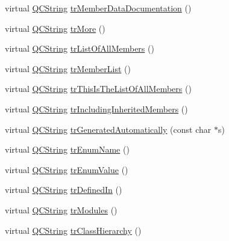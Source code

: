 \begin{DoxyCompactItemize}
\item 
virtual \mbox{\hyperlink{class_q_c_string}{Q\+C\+String}} \mbox{\hyperlink{class_translator_chinesetraditional_a61381745fb939687e8a569ec137cc60c}{tr\+Member\+Data\+Documentation}} ()
\item 
virtual \mbox{\hyperlink{class_q_c_string}{Q\+C\+String}} \mbox{\hyperlink{class_translator_chinesetraditional_ad91d5ea9f31d47efac43960215ce6179}{tr\+More}} ()
\item 
virtual \mbox{\hyperlink{class_q_c_string}{Q\+C\+String}} \mbox{\hyperlink{class_translator_chinesetraditional_a2cf1edd61c495a0858c2a40a97a8212a}{tr\+List\+Of\+All\+Members}} ()
\item 
virtual \mbox{\hyperlink{class_q_c_string}{Q\+C\+String}} \mbox{\hyperlink{class_translator_chinesetraditional_a4d1801a929911c35cf61bd97b7fdcbbc}{tr\+Member\+List}} ()
\item 
virtual \mbox{\hyperlink{class_q_c_string}{Q\+C\+String}} \mbox{\hyperlink{class_translator_chinesetraditional_a2c635ff592e3ca67083d33a8aae4d6be}{tr\+This\+Is\+The\+List\+Of\+All\+Members}} ()
\item 
virtual \mbox{\hyperlink{class_q_c_string}{Q\+C\+String}} \mbox{\hyperlink{class_translator_chinesetraditional_a790281b961ba62ba8135fc4bb483e8f3}{tr\+Including\+Inherited\+Members}} ()
\item 
virtual \mbox{\hyperlink{class_q_c_string}{Q\+C\+String}} \mbox{\hyperlink{class_translator_chinesetraditional_a55b530fe9a9148594cf5899e871d6972}{tr\+Generated\+Automatically}} (const char $\ast$s)
\item 
virtual \mbox{\hyperlink{class_q_c_string}{Q\+C\+String}} \mbox{\hyperlink{class_translator_chinesetraditional_a8709752d130f7edea050ea7daccf2cf1}{tr\+Enum\+Name}} ()
\item 
virtual \mbox{\hyperlink{class_q_c_string}{Q\+C\+String}} \mbox{\hyperlink{class_translator_chinesetraditional_a91000e25a060911c81b829f8fb34c3fb}{tr\+Enum\+Value}} ()
\item 
virtual \mbox{\hyperlink{class_q_c_string}{Q\+C\+String}} \mbox{\hyperlink{class_translator_chinesetraditional_af8a311b8bf69fb4f6985a3e542796337}{tr\+Defined\+In}} ()
\item 
virtual \mbox{\hyperlink{class_q_c_string}{Q\+C\+String}} \mbox{\hyperlink{class_translator_chinesetraditional_a54add4c4469735d158f47f009506f1d6}{tr\+Modules}} ()
\item 
virtual \mbox{\hyperlink{class_q_c_string}{Q\+C\+String}} \mbox{\hyperlink{class_translator_chinesetraditional_a1576ed9649d2871cfbd7870d056cc61b}{tr\+Class\+Hierarchy}} ()

\end{DoxyCompactItemize}
